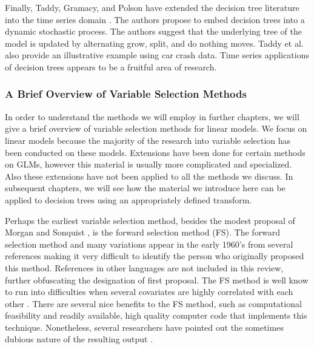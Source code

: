 Finally, Taddy, Gramacy, and Polson have extended the decision tree literature into the time series domain \cite{taddy2011dynamic}. The authors propose to embed decision trees into a dynamic stochastic process. The authors suggest that the underlying tree of the model is updated by alternating grow, split, and do nothing moves. Taddy et al. also provide an illustrative example using car crash data. Time series applications of decision trees appears to be a fruitful area of research. 

\subsubsection{A Brief Overview of Variable Selection Methods}

In order to understand the methods we will employ in further chapters, we will give a brief overview of variable selection methods for linear models. We focus on linear models because the majority of the research into variable selection has been conducted on these models. Extensions have been done for certain methods on GLMs, however this material is usually more complicated and specialized. Also these extensions have not been applied to all the methods we discuss. In subsequent chapters, we will see how the material we introduce here can be applied to decision trees using an appropriately defined transform. 

Perhaps the earliest variable selection method, besides the modest proposal of Morgan and Sonquist \cite{morgan1963problems}, is the forward selection method (FS). The forward selection method and many variations appear in the early 1960's from several references making it very difficult to identify the person who originally proposed this method. References in other languages are not included in this review, further obfuscating the designation of first proposal. The FS method is well know to run into difficulties when several covariates  are highly correlated with each other \cite{miller1984selection}. There are several nice benefits to the FS method, such as computational feasibility and readily available, high quality computer code that implements this technique. Nonetheless, several researchers have pointed out the sometimes dubious nature of the resulting output \cite{halvorson1960regression}. 

